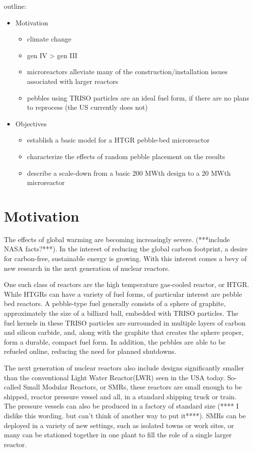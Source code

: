 outline:
\begin{itemize}
\item Motivation
	\begin{itemize}
	\item climate change
	\item gen IV > gen III
	\item microreactors alleviate many of the construction/installation issues associated with larger reactors
	\item pebbles using TRISO particles are an ideal fuel form, if there are no plans to reprocess (the US currently does not)
	\end{itemize}
\item Objectives
	\begin{itemize}
	\item establish a basic model for a HTGR pebble-bed microreactor
	\item characterize the effects of random pebble placement on the results
	\item describe a scale-down from a basic 200 MWth design to a 20 MWth microreactor
	\end{itemize}
\end{itemize}




\section{Motivation}

The effects of global warming are becoming increasingly severe. (***include NASA facts?***).  In the interest of reducing the global carbon footprint, a desire for carbon-free, sustainable energy is growing. With this interest comes a bevy of new research in the next generation of nuclear reactors.

One such class of reactors are the high temperature gas-cooled reactor, or HTGR.  While HTGRs can have a variety of fuel forms, of particular interest are pebble bed reactors.  A pebble-type fuel generally consists of a sphere of graphite, approximately the size of a billiard ball, embedded with TRISO particles.  The fuel kernels in these TRISO particles are surrounded in multiple layers of carbon and silicon carbide, and, along with the graphite that creates the sphere proper, form a durable, compact fuel form.  In addition, the pebbles are able to be refueled online, reducing the need for planned shutdowns.

The next generation of nuclear reactors also include designs significantly smaller than the conventional Light Water Reactor(LWR) seen in the USA today.  So-called Small Modular Reactors, or SMRs, these reactors are small enough to be shipped, reactor pressure vessel and all, in a standard shipping truck or train.  The pressure vessels can also be produced in a factory of standard size (**** I dislike this wording. but can't think of another way to put it****).  SMRs can be deployed in a variety of new settings, such as isolated towns or work sites, or many can be stationed together in one plant to fill the role of a single larger reactor.

